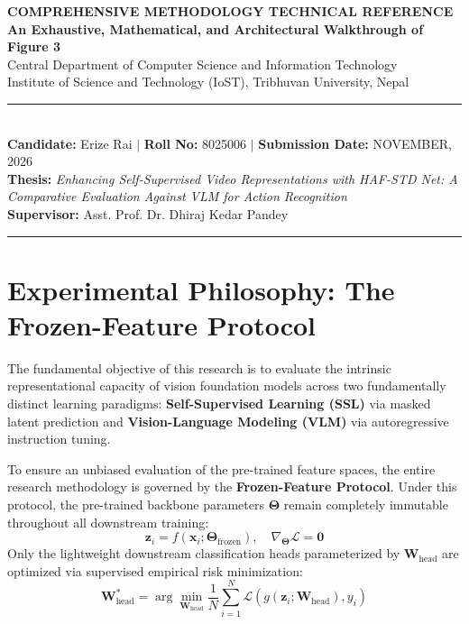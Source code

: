 \documentclass[a4paper, 11pt]{article}
\begin{document}
\begin{center}
  {\fontsize{18}{22}\selectfont \textbf{\color{primaryblue}COMPREHENSIVE METHODOLOGY TECHNICAL REFERENCE}}\\[4pt]
  {\fontsize{12}{15}\selectfont \textbf{\color{accentdark}An Exhaustive, Mathematical, and Architectural Walkthrough of Figure 3}}\\[3pt]
  {\fontsize{10}{13}\selectfont Central Department of Computer Science and Information Technology}\\
  {\fontsize{10}{13}\selectfont Institute of Science and Technology (IoST), Tribhuvan University, Nepal}\\[5pt]
  \rule{\textwidth}{1.2pt}\\[4pt]
  \textbf{Candidate:} Erize Rai \quad$|$ \quad \textbf{Roll No:} 8025006 \quad$|$ \quad \textbf{Submission Date:} NOVEMBER, 2026\\
  \textbf{Thesis:} \textit{Enhancing Self-Supervised Video Representations with HAF-STD Net: A Comparative Evaluation Against VLM for Action Recognition}\\
  \textbf{Supervisor:} Asst. Prof. Dr. Dhiraj Kedar Pandey\\[2pt]
  \rule{\textwidth}{0.6pt}
\end{center}

\vspace{0.2cm}
\tableofcontents
\newpage

\section{Experimental Philosophy: The Frozen-Feature Protocol}

The fundamental objective of this research is to evaluate the intrinsic representational capacity of vision foundation models across two fundamentally distinct learning paradigms: \textbf{Self-Supervised Learning (SSL)} via masked latent prediction and \textbf{Vision-Language Modeling (VLM)} via autoregressive instruction tuning.

To ensure an unbiased evaluation of the pre-trained feature spaces, the entire research methodology is governed by the \textbf{Frozen-Feature Protocol}. Under this protocol, the pre-trained backbone parameters $\mathbf{\Theta}$ remain completely immutable throughout all downstream training:
\begin{equation}
    \mathbf{z}_i = f(\mathbf{x}_i; \mathbf{\Theta}_{\text{frozen}}), \quad \nabla_{\mathbf{\Theta}} \mathcal{L} = \mathbf{0}
\end{equation}
Only the lightweight downstream classification heads parameterized by $\mathbf{W}_{\text{head}}$ are optimized via supervised empirical risk minimization:
\begin{equation}
    \mathbf{W}_{\text{head}}^* = \arg\min_{\mathbf{W}_{\text{head}}} \frac{1}{N}\sum_{i=1}^{N} \mathcal{L}\left( g(\mathbf{z}_i; \mathbf{W}_{\text{head}}), y_i \right)
\end{equation}
\end{document}
